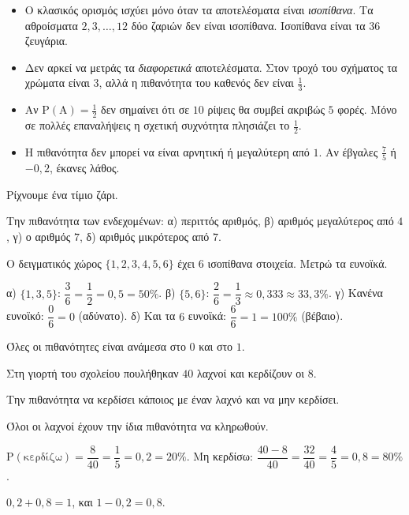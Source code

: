 \begin{prosoxi}
\begin{itemize}[leftmargin=1.2em,itemsep=0.3ex,topsep=2pt]
\item Ο κλασικός ορισμός ισχύει μόνο όταν τα αποτελέσματα είναι \emph{ισοπίθανα}. Τα αθροίσματα $2,3,\dots,12$ δύο ζαριών δεν είναι ισοπίθανα. Ισοπίθανα είναι τα $36$ ζευγάρια.
\item Δεν αρκεί να μετράς τα \emph{διαφορετικά} αποτελέσματα. Στον τροχό του σχήματος τα χρώματα είναι $3$, αλλά η πιθανότητα του καθενός δεν είναι $\frac{1}{3}$.
\item Αν $\mathrm{Ρ}(\mathrm{Α})=\frac{1}{2}$ δεν σημαίνει ότι σε $10$ ρίψεις θα συμβεί ακριβώς $5$ φορές. Μόνο σε πολλές επαναλήψεις η σχετική συχνότητα πλησιάζει το $\frac{1}{2}$.
\item Η πιθανότητα δεν μπορεί να είναι αρνητική ή μεγαλύτερη από $1$. Αν έβγαλες $\frac{7}{5}$ ή $-0{,}2$, έκανες λάθος.
\end{itemize}
\end{prosoxi}


\tixero Ρίχνουμε ένα τίμιο ζάρι.\par
\tithelo Την πιθανότητα των ενδεχομένων: α) περιττός αριθμός, β) αριθμός μεγαλύτερος από $4$, γ) ο αριθμός $7$, δ) αριθμός μικρότερος από $7$.\par
\possindeo Ο δειγματικός χώρος $\{1,2,3,4,5,6\}$ έχει $6$ ισοπίθανα στοιχεία. Μετρώ τα ευνοϊκά.\par
\apantisi α) $\{1,3,5\}$: $\dfrac{3}{6}=\dfrac{1}{2}=0{,}5=50\%$. β) $\{5,6\}$: $\dfrac{2}{6}=\dfrac{1}{3}\approx0{,}333\approx33{,}3\%$. γ) Κανένα ευνοϊκό: $\dfrac{0}{6}=0$ (αδύνατο). δ) Και τα $6$ ευνοϊκά: $\dfrac{6}{6}=1=100\%$ (βέβαιο).\par
\elegxos Όλες οι πιθανότητες είναι ανάμεσα στο $0$ και στο $1$.

\tixero Στη γιορτή του σχολείου πουλήθηκαν $40$ λαχνοί και κερδίζουν οι $8$.\par
\tithelo Την πιθανότητα να κερδίσει κάποιος με έναν λαχνό και να μην κερδίσει.\par
\possindeo Όλοι οι λαχνοί έχουν την ίδια πιθανότητα να κληρωθούν.\par
\apantisi $\mathrm{Ρ}(\text{κερδίζω})=\dfrac{8}{40}=\dfrac{1}{5}=0{,}2=20\%$. Μη κερδίσω: $\dfrac{40-8}{40}=\dfrac{32}{40}=\dfrac{4}{5}=0{,}8=80\%$.\par
\elegxos $0{,}2+0{,}8=1$, και $1-0{,}2=0{,}8$.

